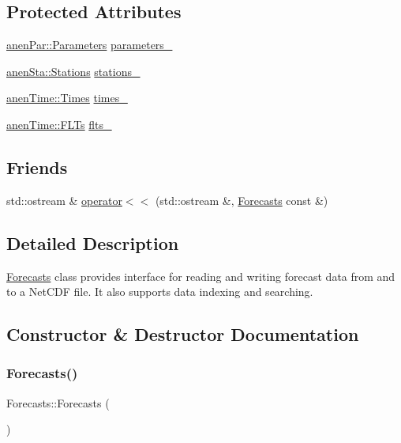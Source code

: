 \subsection*{Protected Attributes}
\begin{DoxyCompactItemize}
\item 
\mbox{\hyperlink{classanen_par_1_1_parameters}{anen\+Par\+::\+Parameters}} \mbox{\hyperlink{class_forecasts_a514e1029a27c9d797212158238e4ec86}{parameters\+\_\+}}
\item 
\mbox{\hyperlink{classanen_sta_1_1_stations}{anen\+Sta\+::\+Stations}} \mbox{\hyperlink{class_forecasts_ac86fcc7d20b581d87a32eac26a5f8b01}{stations\+\_\+}}
\item 
\mbox{\hyperlink{classanen_time_1_1_times}{anen\+Time\+::\+Times}} \mbox{\hyperlink{class_forecasts_a5db6d70382b21bc6621b7765d21f6d61}{times\+\_\+}}
\item 
\mbox{\hyperlink{classanen_time_1_1_f_l_ts}{anen\+Time\+::\+F\+L\+Ts}} \mbox{\hyperlink{class_forecasts_ace7fb459c34db19dfb77bc6861f9cdf5}{flts\+\_\+}}
\end{DoxyCompactItemize}
\subsection*{Friends}
\begin{DoxyCompactItemize}
\item 
std\+::ostream \& \mbox{\hyperlink{class_forecasts_a42c14120042eae287169092654f5b6c8}{operator$<$$<$}} (std\+::ostream \&, \mbox{\hyperlink{class_forecasts}{Forecasts}} const \&)
\end{DoxyCompactItemize}


\subsection{Detailed Description}
\mbox{\hyperlink{class_forecasts}{Forecasts}} class provides interface for reading and writing forecast data from and to a Net\+C\+DF file. It also supports data indexing and searching. 

\subsection{Constructor \& Destructor Documentation}
\mbox{\label{class_forecasts_a2614be37bc63171f7d2b9d8b9f9d8871}} 
\subsubsection{\texorpdfstring{Forecasts()}{Forecasts()}\hspace{0.1cm}{\footnotesize\ttfamily [1/3]}}
{\footnotesize\ttfamily Forecasts\+::\+Forecasts (\begin{DoxyParamCaption}{ }\end{DoxyParamCaption})}

